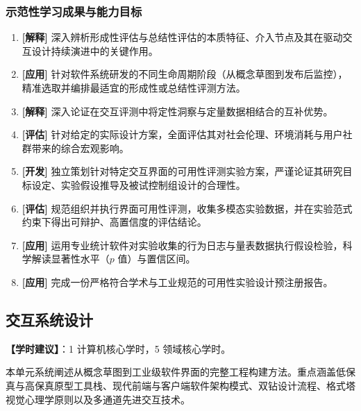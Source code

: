 \subsubsection{示范性学习成果与能力目标}
\begin{enumerate}
    \item \textbf{[解释]} 深入辨析形成性评估与总结性评估的本质特征、介入节点及其在驱动交互设计持续演进中的关键作用。
    \item \textbf{[应用]} 针对软件系统研发的不同生命周期阶段（从概念草图到发布后监控），精准选取并编排最适宜的形成性或总结性评测方法。
    \item \textbf{[解释]} 深入论证在交互评测中将定性洞察与定量数据相结合的互补优势。
    \item \textbf{[评估]} 针对给定的实际设计方案，全面评估其对社会伦理、环境消耗与用户社群带来的综合宏观影响。
    \item \textbf{[开发]} 独立策划针对特定交互界面的可用性评测实验方案，严谨论证其研究目标设定、实验假设推导及被试控制组设计的合理性。
    \item \textbf{[评估]} 规范组织并执行界面可用性评测，收集多模态实验数据，并在实验范式约束下得出可辩护、高置信度的评估结论。
    \item \textbf{[应用]} 运用专业统计软件对实验收集的行为日志与量表数据执行假设检验，科学解读显著性水平（$p$ 值）与置信区间。
    \item \textbf{[应用]} 完成一份严格符合学术与工业规范的可用性实验设计预注册报告。
\end{enumerate}

\subsection{交互系统设计}
\textbf{【学时建议】}：1 计算机核心学时，5 领域核心学时。

本单元系统阐述从概念草图到工业级软件界面的完整工程构建方法。重点涵盖低保真与高保真原型工具栈、现代前端与客户端软件架构模式、双钻设计流程、格式塔视觉心理学原则以及多通道先进交互技术。

